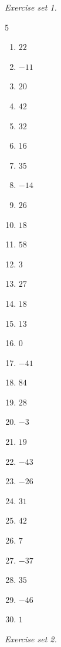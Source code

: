 \par\noindent\emph{Exercise set 1.}\nopagebreak
\begin{multicols}{5}\raggedright
\begin{enumerate}[label=\arabic*., leftmargin=*, itemsep=1pt]
\item $22$
\item $-11$
\item $20$
\item $42$
\item $32$
\item $16$
\item $35$
\item $-14$
\item $26$
\item $18$
\item $58$
\item $3$
\item $27$
\item $18$
\item $13$
\item $0$
\item $-41$
\item $84$
\item $28$
\item $-3$
\item $19$
\item $-43$
\item $-26$
\item $31$
\item $42$
\item $7$
\item $-37$
\item $35$
\item $-46$
\item $1$
\end{enumerate}
\end{multicols}
\par\noindent\emph{Exercise set 2.}\nopagebreak
